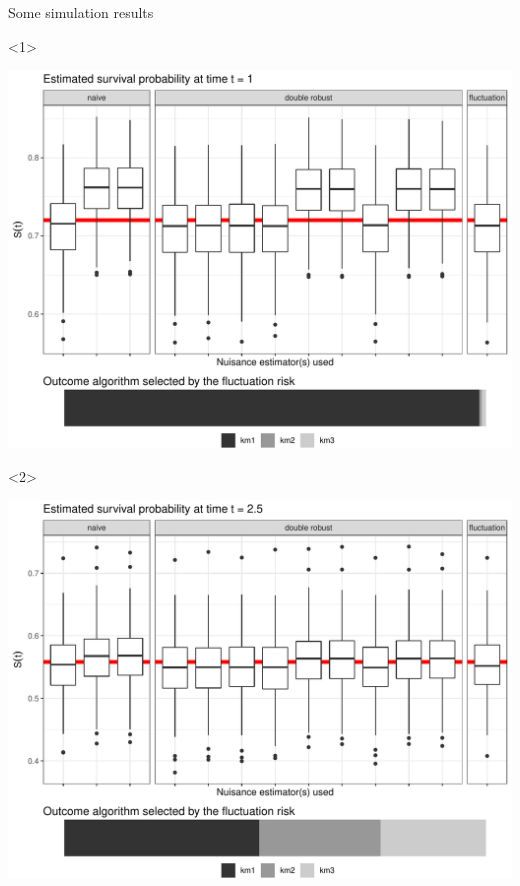 \documentclass[smaller]{beamer}\usepackage{listings}
\begin{document}
\begin{frame}[label={sec:orgb271052}]{Some simulation results}
\begin{onlyenv}<1>
\begin{center}
\includegraphics[width=.9\linewidth]{sim-results1.pdf}
\end{center}
\end{onlyenv}


\begin{onlyenv}<2>
\begin{center}
\includegraphics[width=.9\linewidth]{sim-results2.pdf}
\end{center}
\end{onlyenv}
\end{frame}
\end{document}
